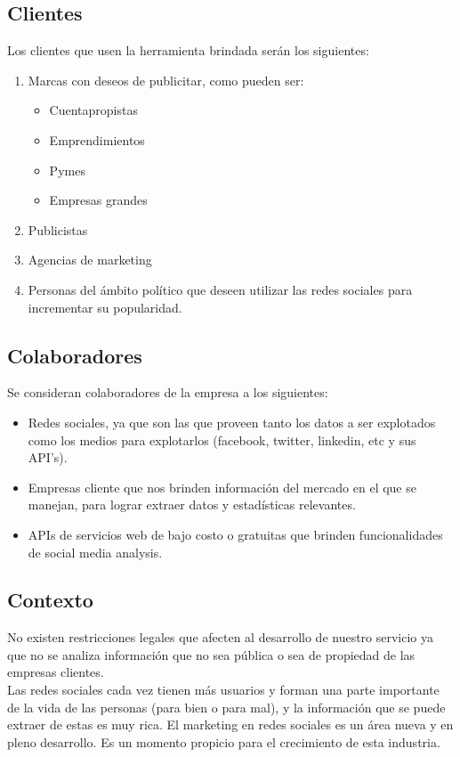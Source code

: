 \documentclass[oneside]{book}
\begin{document}
\subsection{Clientes}
Los clientes que usen la herramienta brindada serán los siguientes:

\begin{enumerate}
	\item Marcas con deseos de publicitar, como pueden ser:
	\begin{itemize}
		\item Cuentapropistas
		\item Emprendimientos 
		\item Pymes
		\item Empresas grandes
	\end{itemize}
	\item Publicistas
	\item Agencias de marketing
	\item Personas del \'{a}mbito pol\'{i}tico que deseen utilizar las redes sociales para incrementar su popularidad. 
\end{enumerate}


\subsection{Colaboradores}
Se consideran colaboradores de la empresa a los siguientes:
\begin{itemize}
	\item Redes sociales, ya que son las que proveen tanto los datos a ser explotados como los medios para explotarlos (facebook, twitter, linkedin, etc y sus API's).\\
	
	\item Empresas cliente que nos brinden informaci\'{o}n del mercado en el que se manejan, para lograr extraer datos y estadísticas relevantes. \\
	\item APIs de servicios web de bajo costo o gratuitas que brinden funcionalidades de social media analysis.
\end{itemize}




\subsection{Contexto}
No existen restricciones legales que afecten al desarrollo de nuestro servicio ya que no se analiza información que no sea pública o sea de propiedad de las empresas clientes.\\
Las redes sociales cada vez tienen más usuarios y forman una parte importante de la vida de las personas (para bien o para mal), y la información que se puede extraer de estas es muy rica. El  marketing en redes sociales es un área nueva y en pleno desarrollo. Es un momento propicio para el crecimiento de esta industria.
\end{document}
